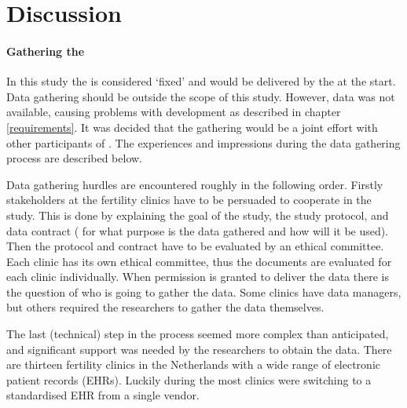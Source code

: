 \section{Discussion}

\paragraph{Gathering the \projectdata{}}

In this study the \projectdata{} is considered `fixed' and would be delivered by the \project{} at the start.
Data gathering should be outside the scope of this study.
However, data was not available, causing problems with development as described in chapter \ref{requirements}.
It was decided that the gathering would be a joint effort with other participants of \project{}.
The experiences and impressions during the data gathering process are described below.

Data gathering hurdles are encountered roughly in the following order.
Firstly stakeholders at the fertility clinics have to be persuaded to cooperate in the study.
This is done by explaining the goal of the study, the study protocol, and data contract (\ie{} for what purpose is the data gathered and how will it be used).
Then the protocol and contract have to be evaluated by an ethical committee.
Each clinic has its own ethical committee, thus the documents are evaluated for each clinic individually.
When permission is granted to deliver the data there is the question of who is going to gather the data.
Some clinics have data managers, but others required the \project{} researchers to gather the data themselves.

The last (technical) step in the process seemed more complex than anticipated, and significant support was needed by the \project{} researchers to obtain the data.
There are thirteen fertility clinics in the Netherlands with a wide range of electronic patient records (EHRs).
Luckily during the \project{} most clinics were switching to a standardised EHR from a single vendor.

